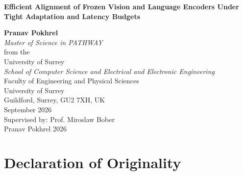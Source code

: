\documentclass[11pt,a4paper,oneside]{report}
\begin{document}
\normalsize
\rhead{\textcolor{ashgrey}{Pranav Pokhrel, MSc dissertation}}
\renewcommand{\headrulewidth}{0pt}
\begin{center}
{\LARGE {\vspace*{0.5cm}\Huge\bf Efficient Alignment of Frozen Vision and
Language Encoders Under Tight Adaptation and Latency Budgets}}

\vspace{3em}
        {\Large \bf Pranav Pokhrel}\\
        \vspace{2em}
        {\Large\textit{Master of Science in PATHWAY}\\
        from the\\
        University of Surrey\\
        \vspace{2em}
        \centering
        \vspace{2em}
        \textit{School of Computer Science and Electrical and Electronic Engineering}\\
		 Faculty of Engineering and Physical Sciences\\
		University of Surrey\\
		Guildford, Surrey, GU2 7XH, UK\\
        \vspace{2em}
        September 2026\\
       Supervised by: Prof. Miroslaw Bober\\
        }
        \textcopyright Pranav Pokhrel 2026
\end{center}

\clearpage
\newpage
\chapter*{Declaration of Originality}
\end{document}
